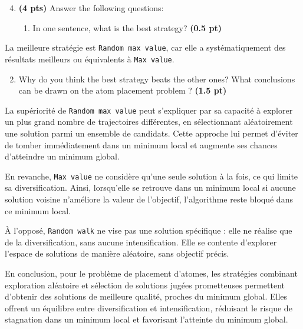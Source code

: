 \documentclass[11pt,a4paper]{report}
\begin{document}
\begin{enumerate}
\setcounter{enumi}{3}
    \item \textbf{(4 pts)} Answer the following questions:
    \begin{enumerate}
        \item In one sentence, what is the best strategy? \textbf{(0.5 pt)}
    \end{enumerate}
\end{enumerate}

\begin{answers}[3.5cm]
La meilleure stratégie est \texttt{Random max value}, car elle a systématiquement des résultats meilleurs ou équivalents à \texttt{Max value}.
\end{answers}


\newpage
\begin{enumerate}
\setcounter{enumi}{3}
\begin{enumerate}
\setcounter{enumii}{1}
    \item Why do you think the best strategy beats the other ones? What conclusions can be drawn on the atom placement problem ? \textbf{(1.5 pt)}
\end{enumerate}
\end{enumerate}

\begin{answers}[7.5cm]
La supériorité de \texttt{Random max value} peut s’expliquer par sa capacité à explorer un plus grand nombre de trajectoires différentes, en sélectionnant aléatoirement une solution parmi un ensemble de candidats. Cette approche lui permet d’éviter de tomber immédiatement dans un minimum local et augmente ses chances d’atteindre un minimum global.

En revanche, \texttt{Max value} ne considère qu’une seule solution à la fois, ce qui limite sa diversification. Ainsi, lorsqu’elle se retrouve dans un minimum local si aucune solution voisine n’améliore la valeur de l’objectif, l’algorithme reste bloqué dans ce minimum local.

À l’opposé, \texttt{Random walk} ne vise pas une solution spécifique : elle ne réalise que de la diversification, sans aucune intensification. Elle se contente d’explorer l’espace de solutions de manière aléatoire, sans objectif précis.

En conclusion, pour le problème de placement d’atomes, les stratégies combinant exploration aléatoire et sélection de solutions jugées prometteuses permettent d’obtenir des solutions de meilleure qualité, proches du minimum global. Elles offrent un équilibre entre diversification et intensification, réduisant le risque de stagnation dans un minimum local et favorisant l’atteinte du minimum global.


\end{answers}
\end{document}
